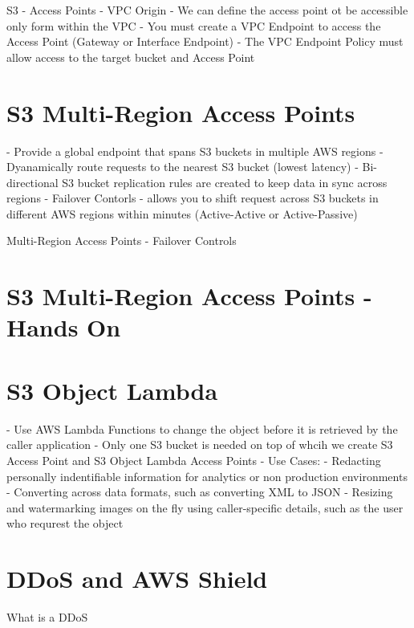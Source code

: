 \documentclass[11pt]{book}
\begin{document}
    S3 - Access Points - VPC Origin
    - We can define the access point ot be accessible only form within the VPC
    - You must create a VPC Endpoint to access the Access Point (Gateway or Interface Endpoint)
    - The VPC Endpoint Policy must allow access to the target bucket and Access Point

    \section{S3 Multi-Region Access Points}
    - Provide a global endpoint that spans S3 buckets in multiple AWS regions
    - Dyanamically route requests to the nearest S3 bucket (lowest latency)
    - Bi-directional S3 bucket replication rules are created to keep data in sync across regions
    - Failover Contorls - allows you to shift request across S3 buckets in different AWS regions within minutes (Active-Active or Active-Passive)


    Multi-Region Access Points - Failover Controls

    \section{S3 Multi-Region Access Points - Hands On}

    \section{S3 Object Lambda}
    - Use AWS Lambda Functions to change the object before it is retrieved by the caller application
    - Only one S3 bucket is needed on top of whcih we create S3 Access Point and S3 Object Lambda Access Points
    - Use Cases:
        - Redacting personally indentifiable information for analytics or non production environments
        - Converting across data formats, such as converting XML to JSON
        - Resizing and watermarking images on the fly using caller-specific details, such as the user who requrest the object



    \section{DDoS and AWS Shield}
    What is a DDoS
\end{document}
